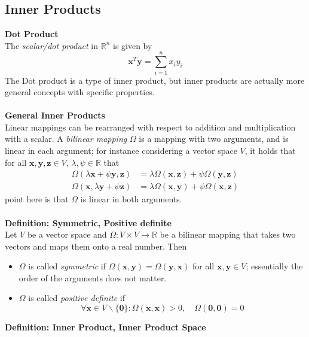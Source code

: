 \documentclass{report}
\begin{document}
\subsection{Inner Products} %
\textbf{Dot Product}\\
The \textit{scalar/dot product} in $\mathbb{R}^n$ is given by
\begin{equation*}
\bm{x}^T\bm{y}=\sum^n_{i=1}x_iy_i
\end{equation*}
The Dot product is a type of inner product, but inner products are actually more general concepts with specific properties.\\
\vspace{1mm}\\
\textbf{General Inner Products}\\
Linear mappings can be rearranged with respect to addition and multiplication with a scalar. 
A \textit{bilinear mapping} $\Omega$ is a mapping with two arguments, and is linear in each argument; for instance
considering a vector space $V$, it holds that for all
$\bm{x},\bm{y},\bm{z}\in V,\,\lambda,\psi\in\mathbb{R}$
that
\begin{align*}
\Omega(\lambda\bm{x}+\psi\bm{y},\bm{z})&=\lambda\Omega(\bm{x},\bm{z})+\psi\Omega(\bm{y},\bm{z})\\
\Omega(\bm{x},\lambda\bm{y}+\psi\bm{z})&=\lambda\Omega(\bm{x},\bm{y})+\psi\Omega(\bm{x},\bm{z})
\end{align*}
point here is that $\Omega$ is linear in both arguments.\\
\vspace{1mm}\\
\textbf{Definition: Symmetric, Positive definite}\\
Let $V$ be a vector space and $\Omega:V\times V\to\mathbb{R}$ be a bilinear mapping that takes two
vectors and maps them onto a real number. Then
\begin{itemize}
\item$\Omega$ is called \textit{symmetric} if $\Omega(\bm{x},\bm{y})=\Omega(\bm{y},\bm{x})$ for all
$\bm{x},\bm{y}\in V$; essentially the order of the arguments does not matter.
\item$\Omega$ is called \textit{positive definite} if
\begin{equation*}
\forall\bm{x}\in V\backslash\{\mathbf{0}\}:\Omega(\bm{x},\bm{x})>0,\quad\Omega(\bm{0},\bm{0})=0
\end{equation*}
\end{itemize}
\textbf{Definition: Inner Product, Inner Product Space}\\
\end{document}
